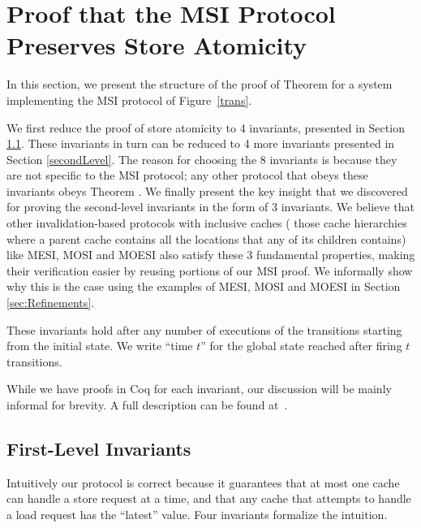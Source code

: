 \section{Proof that the MSI Protocol Preserves Store Atomicity}
\label{safety}

In this section, we present the structure of the proof of Theorem
 for a system implementing the MSI protocol of
Figure~\ref{trans}.

We first reduce the proof of store atomicity to 4 invariants, presented in
Section \ref{firstLevel}. These invariants in turn can be reduced to 4 more
invariants presented in Section \ref{secondLevel}. The reason for choosing the 8
 invariants is because they are not specific to the MSI protocol;
any other protocol that obeys these invariants obeys Theorem
. We finally present the key insight that we
discovered for proving the second-level invariants in the form of 3 invariants.
We believe that other invalidation-based protocols with inclusive caches (\ie{}
those cache hierarchies where a parent cache contains all the locations that
any of its children contains) like MESI, MOSI and MOESI also
satisfy these 3 fundamental properties, making their verification easier by reusing
portions of our MSI proof.
We informally show why this is the case using the examples of MESI,
MOSI and MOESI in Section \ref{sec:Refinements}.


These invariants hold after any number of executions of the transitions starting
from the initial state. We write ``time $t$'' for the global state
reached after firing $t$ transitions.

While we have proofs in Coq for each invariant, our discussion will be mainly
informal for brevity. A full description can be found at~. 

\subsection{First-Level Invariants}
\label{firstLevel}
Intuitively our protocol is correct because it guarantees that at most one
cache can handle a store request at a time, and that any cache that attempts to
handle a load request has the ``latest'' value. Four invariants formalize
the intuition.

